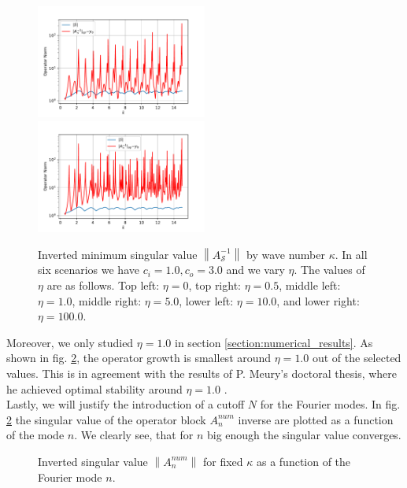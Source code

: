 \documentclass[12pt,journal,compsoc, onecolumn]{IEEEtran}
\begin{document}
\begin{figure}
     \includegraphics[width=0.5\textwidth]{InvertedMinimumSingularValuec_i1,0c_o3,0N_30eta10start_0,5end_15shiftFirstValue_Trueremove_Falseindexrange_-10,0-0,0_y_0_0,8864570097015256.pdf} 
    \includegraphics[width=0.5\textwidth]{InvertedMinimumSingularValuec_i1,0c_o3,0N_30eta100,0start_0,5end_15shiftFirstValue_Trueremove_Falseindexrange_-18,0-0,0_y_0_0,8972397818023745.pdf} 
    \caption{Inverted minimum singular value $\left\|A_{\mathcal{S}}^{-1}\right\|$ by wave number $\kappa$. In all six scenarios we have $c_i = 1.0, c_o = 3.0$ and we vary $\eta$. The values of $\eta$ are as follows. Top left: $\eta = 0$, top right: $\eta = 0.5$, middle left: $\eta = 1.0$, middle right: $\eta = 5.0$,  lower left: $\eta = 10.0$, and lower right: $\eta = 100.0$.}
   \label{fig:eta_other_results}
\end{figure}
\noindent
Moreover, we only studied $\eta = 1.0$ in section \ref{section:numerical_results}. As shown in fig. \ref{fig:eta_other_results}, the operator growth is smallest around $\eta = 1.0$ out of the selected values. This is in agreement with the results of P. Meury's doctoral thesis, where he achieved optimal stability around $\eta = 1.0$ \cite{meury2007stable}.
\\
Lastly, we will justify the introduction of a cutoff $N$ for the Fourier modes. In fig. \ref{fig:eta_other_results} the singular value of the operator block $A^{num}_n$ inverse are plotted as a function of the mode $n$. We clearly see, that for $n$ big enough the singular value converges. 
\begin{figure}
    \caption{Inverted singular value $\left\|A^{num}_n\right\|$ for fixed $\kappa$ as a function of the Fourier mode $n$. }
   \label{fig:eta_other_results}
\end{figure}
\end{document}
